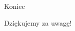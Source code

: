 
\begin{frame}{Koniec}
    \begin{center}
        {\huge Dziękujemy za uwagę!}
    \end{center}
\end{frame}

\pglastframe